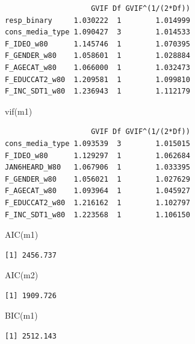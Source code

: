 \documentclass[
  letterpaper,
  DIV=11,
  numbers=noendperiod]{scrartcl}
\newenvironment{Shaded}{\begin{snugshade}}{\end{snugshade}}
\newcommand{\FunctionTok}[1]{\textcolor[rgb]{0.28,0.35,0.67}{#1}}
\newcommand{\NormalTok}[1]{\textcolor[rgb]{0.00,0.23,0.31}{#1}}
\begin{document}
\begin{verbatim}
                    GVIF Df GVIF^(1/(2*Df))
resp_binary     1.030222  1        1.014999
cons_media_type 1.090427  3        1.014533
F_IDEO_w80      1.145746  1        1.070395
F_GENDER_w80    1.058601  1        1.028884
F_AGECAT_w80    1.066000  1        1.032473
F_EDUCCAT2_w80  1.209581  1        1.099810
F_INC_SDT1_w80  1.236943  1        1.112179
\end{verbatim}

\begin{Shaded}
\begin{Highlighting}[]
\FunctionTok{vif}\NormalTok{(m1)}
\end{Highlighting}
\end{Shaded}

\begin{verbatim}
                    GVIF Df GVIF^(1/(2*Df))
cons_media_type 1.093539  3        1.015015
F_IDEO_w80      1.129297  1        1.062684
JAN6HEARD_W80   1.067906  1        1.033395
F_GENDER_w80    1.056021  1        1.027629
F_AGECAT_w80    1.093964  1        1.045927
F_EDUCCAT2_w80  1.216162  1        1.102797
F_INC_SDT1_w80  1.223568  1        1.106150
\end{verbatim}

\begin{Shaded}
\begin{Highlighting}[]
\FunctionTok{AIC}\NormalTok{(m1)}
\end{Highlighting}
\end{Shaded}

\begin{verbatim}
[1] 2456.737
\end{verbatim}

\begin{Shaded}
\begin{Highlighting}[]
\FunctionTok{AIC}\NormalTok{(m2)}
\end{Highlighting}
\end{Shaded}

\begin{verbatim}
[1] 1909.726
\end{verbatim}

\begin{Shaded}
\begin{Highlighting}[]
\FunctionTok{BIC}\NormalTok{(m1)}
\end{Highlighting}
\end{Shaded}

\begin{verbatim}
[1] 2512.143
\end{verbatim}
\end{document}
